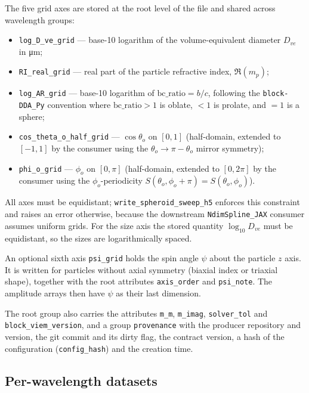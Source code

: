 \documentclass[11pt,a4paper]{article}
\begin{document}
The five grid axes are stored at the root level of the file and shared
across wavelength groups:
\begin{itemize}
  \item \texttt{log\_D\_ve\_grid} --- base-10 logarithm of the
        volume-equivalent diameter $D_{ve}$ in \si{\micro\metre};
  \item \texttt{RI\_real\_grid} --- real part of the particle refractive
        index, $\Re(m_p)$;
  \item \texttt{log\_AR\_grid} --- base-10 logarithm of
        $\text{bc\_ratio} = b/c$, following the
        \texttt{block-DDA\_Py} convention where $\text{bc\_ratio}>1$ is
        oblate, $<1$ is prolate, and $=1$ is a sphere;
  \item \texttt{cos\_theta\_o\_half\_grid} --- $\cos\theta_o$ on
        $[0,1]$ (half-domain, extended to $[-1,1]$ by the consumer
        using the $\theta_o\to\pi-\theta_o$ mirror symmetry);
  \item \texttt{phi\_o\_grid} --- $\phi_o$ on $[0,\pi]$ (half-domain,
        extended to $[0,2\pi]$ by the consumer using the
        $\phi_o$-periodicity $S(\theta_o,\phi_o+\pi)=S(\theta_o,\phi_o)$).
\end{itemize}
All axes must be equidistant; \texttt{write\_spheroid\_sweep\_h5}
enforces this constraint and raises an error otherwise, because the
downstream \texttt{NdimSpline\_JAX} consumer assumes uniform grids.
For the size axis the stored quantity $\log_{10} D_{ve}$ must be
equidistant, so the sizes are logarithmically spaced.

An optional sixth axis \texttt{psi\_grid} holds the spin angle $\psi$
about the particle $z$ axis. It is written for particles without axial
symmetry (biaxial index or triaxial shape), together with the root
attributes \texttt{axis\_order} and \texttt{psi\_note}. The amplitude
arrays then have $\psi$ as their last dimension.

The root group also carries the attributes \texttt{m\_m},
\texttt{m\_imag}, \texttt{solver\_tol} and
\texttt{block\_viem\_version}, and a group \texttt{provenance} with
the producer repository and version, the git commit and its dirty flag,
the contract version, a hash of the configuration
(\texttt{config\_hash}) and the creation time.

\subsection{Per-wavelength datasets}
\label{sec:sweep-data}
\end{document}
